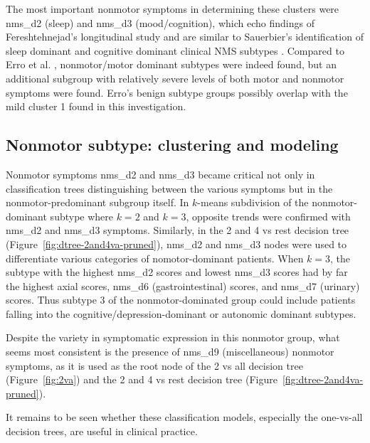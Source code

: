 \documentclass[10pt]{article}
\begin{document}
\begin{multicols}{2}
The most important nonmotor symptoms in determining these clusters were nms\_d2
(sleep) and nms\_d3 (mood/cognition), which echo findings of Fereshtehnejad's
longitudinal study \cite{fereshtehnejad15} and are similar to Sauerbier's
identification of sleep dominant and cognitive dominant clinical NMS subtypes
\cite{sauerbier15}. Compared to Erro et al. \cite{erro13}, nonmotor/motor
dominant subtypes were indeed found, but an additional subgroup with relatively
severe levels of both motor and nonmotor symptoms were found. Erro's benign
subtype groups possibly overlap with the mild cluster 1 found in this
investigation.

\subsection{Nonmotor subtype: clustering and modeling}
Nonmotor symptoms nms\_d2 and nms\_d3 became critical not only in
classification trees distinguishing between the various symptoms but in the
nonmotor-predominant subgroup itself. In $k$-means subdivision of the
nonmotor-dominant subtype where $k = 2$ and $k = 3$, opposite trends were
confirmed with nms\_d2 and nms\_d3 symptoms. Similarly, in the 2 and 4 vs rest
decision tree (Figure~\ref{fig:dtree-2and4va-pruned}), nms\_d2 and nms\_d3 nodes were
used to differentiate various categories of nomotor-dominant patients.
When $k = 3$, the subtype with the highest nms\_d2 scores and lowest
nms\_d3 scores had by far the highest axial scores, nms\_d6 (gastrointestinal)
scores, and nms\_d7 (urinary) scores. Thus subtype 3 of the nonmotor-dominated
group could include patients falling into the cognitive/depression-dominant or
autonomic dominant subtypes.

Despite the variety in symptomatic expression in this nonmotor group, what
seems most consistent is the presence of nms\_d9 (miscellaneous) nonmotor
symptoms, as it is used as the root node of the 2 vs all decision tree
(Figure~\ref{fig:2va}) and the 2 and 4 vs rest decision tree
(Figure~\ref{fig:dtree-2and4va-pruned}).

It remains to be seen whether these classification models, especially the one-vs-all decision
trees, are useful in clinical practice.




\end{multicols}
\end{document}
